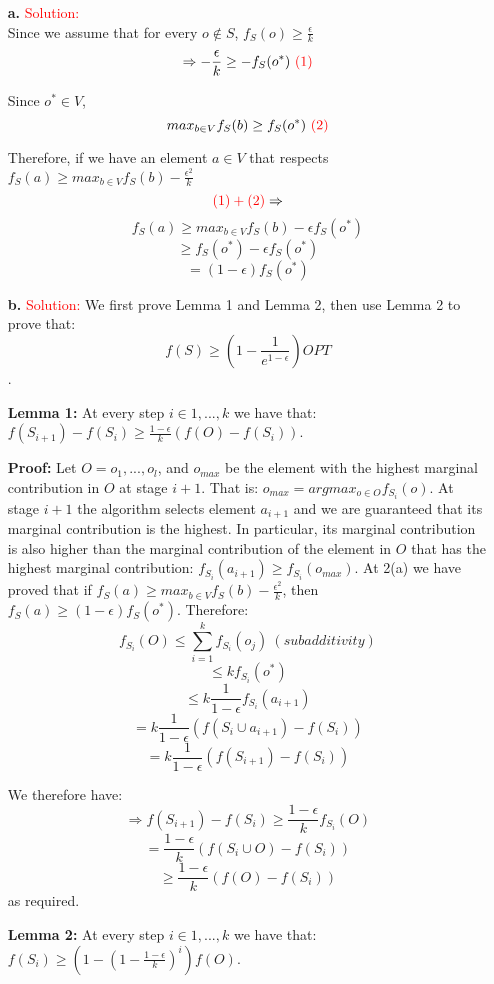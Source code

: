 \documentclass[11pt]{article} %
\begin{document}
\begin{itemize}		
\item[\textbf{a.} ] 
\textcolor{red}{Solution:} \\
Since we assume that for every $o \notin S$, $f_S(o) \ge \frac{\epsilon}{k} $
$$ \Rightarrow -\frac{\epsilon}{k} \ge -f_S(o^*) \       \textcolor{red}{(1)} $$

Since $o^{*} \in V$, 
$$max_{b \in V} f_S(b) \ge f_S(o^{*}) \       \textcolor{red}{(2)} $$

Therefore, if we have an element $a \in V$ that respects $f_S(a) \ge max_{b \in V} f_S(b) - \frac{\epsilon^2}{k} $
$$ \textcolor{red}{(1)+(2)} \Rightarrow $$
$$f_S(a) \ge max_{b \in V} f_S(b) -  \epsilon f_S(o^{*})$$
$$ \ge  f_S(o^{*}) -  \epsilon f_S(o^{*})$$
$$ = (1-\epsilon) f_S(o^{*})$$

\item[\textbf{b.} ] 
\textcolor{red}{Solution:} We first prove Lemma 1 and Lemma 2, then use Lemma 2 to prove that: $$ f(S) \ge (1-\frac{1}{e^{1-\epsilon}})OPT$$.

\textbf{Lemma 1:} At every step $i \in {1,...,k}$ we have that: $f(S_{i+1})-f(S_i) \ge \frac{1-\epsilon}{k} (f(O)-f(S_i))$. 

\textbf{Proof:} 
Let $O={o_1,...,o_l}$, and $o_{max}$ be the element with the highest marginal contribution in $O$ at stage $i+1$. That is: $o_{max}=argmax_{o \in O} f_{S_i}(o)$. At stage $i+1$ the algorithm selects element $a_{i+1}$ and we are guaranteed that its marginal contribution is the highest. In particular, its marginal contribution is also higher than the marginal contribution of the element in $O$ that has the highest marginal contribution: $f_{S_i}(a_{i+1}) \ge f_{S_i}(o_{max})$. At 2(a) we have proved that if  $f_S(a) \ge max_{b \in V} f_S(b) - \frac{\epsilon^2}{k} $, then $f_S(a) \ge (1-\epsilon) f_S(o^{*})$. Therefore:
$$ f_{S_i}(O) \le \sum_{i=1}^{k}  f_{S_i}(o_j) \  (subadditivity)$$  
$$ \le k  f_{S_i}(o^*) $$
$$ \le k \frac{1}{1-\epsilon} f_{S_i}(a_{i+1})$$
$$ =k \frac{1}{1-\epsilon} (f({S_i} \cup a_{i+1}) -f({S_i}))$$
$$ =k \frac{1}{1-\epsilon} (f({S_{i+1}}) -f({S_i}))$$

We therefore have: 
$$ \Rightarrow f({S_{i+1}}) -f({S_i}) \ge \frac{1-\epsilon}{k} f_{S_i}(O)$$
$$ = \frac{1-\epsilon}{k} (f (S_i \cup O)-f (S_i))$$
$$ \ge \frac{1-\epsilon}{k}  (f ( O)-f (S_i))$$
as required.
 

\textbf{Lemma 2:} At every step $i \in {1,...,k}$ we have that: $f(S_i) \ge (1-{(1-\frac{1-\epsilon}{k})}^i)f(O)$.  


\end{itemize}
\end{document}
